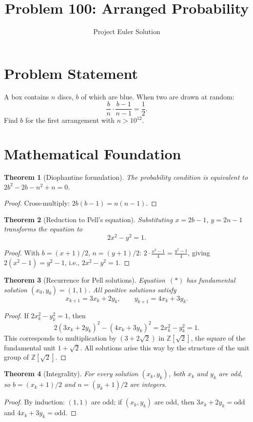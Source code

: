 \documentclass[12pt]{article}
\title{Problem 100: Arranged Probability}
\author{Project Euler Solution}
\date{}
\newtheorem{theorem}{Theorem}
\begin{document}
\maketitle

\section{Problem Statement}
A box contains $n$ discs, $b$ of which are blue. When two are drawn at random:
\[
\frac{b}{n} \cdot \frac{b-1}{n-1} = \frac{1}{2}.
\]
Find $b$ for the first arrangement with $n > 10^{12}$.

\section{Mathematical Foundation}

\begin{theorem}[Diophantine formulation]
The probability condition is equivalent to $2b^2 - 2b - n^2 + n = 0$.
\end{theorem}
\begin{proof}
Cross-multiply: $2b(b-1) = n(n-1)$.
\end{proof}

\begin{theorem}[Reduction to Pell's equation]
\label{thm:pell}
Substituting $x = 2b - 1$, $y = 2n - 1$ transforms the equation to
\[
2x^2 - y^2 = 1. \tag{$*$}
\]
\end{theorem}
\begin{proof}
With $b = (x+1)/2$, $n = (y+1)/2$: $2 \cdot \frac{x^2-1}{4} = \frac{y^2-1}{4}$, giving $2(x^2-1) = y^2-1$, i.e., $2x^2 - y^2 = 1$.
\end{proof}

\begin{theorem}[Recurrence for Pell solutions]
\label{thm:rec}
Equation~$(*)$ has fundamental solution $(x_0, y_0) = (1, 1)$. All positive solutions satisfy
\[
x_{k+1} = 3x_k + 2y_k, \qquad y_{k+1} = 4x_k + 3y_k.
\]
\end{theorem}
\begin{proof}
If $2x_k^2 - y_k^2 = 1$, then
\[
2(3x_k + 2y_k)^2 - (4x_k + 3y_k)^2 = 2x_k^2 - y_k^2 = 1.
\]
This corresponds to multiplication by $(3 + 2\sqrt{2})$ in $\mathbb{Z}[\sqrt{2}]$, the square of the fundamental unit $1 + \sqrt{2}$. All solutions arise this way by the structure of the unit group of $\mathbb{Z}[\sqrt{2}]$.
\end{proof}

\begin{theorem}[Integrality]
For every solution $(x_k, y_k)$, both $x_k$ and $y_k$ are odd, so $b = (x_k+1)/2$ and $n = (y_k+1)/2$ are integers.
\end{theorem}
\begin{proof}
By induction: $(1,1)$ are odd; if $(x_k, y_k)$ are odd, then $3x_k + 2y_k = \text{odd}$ and $4x_k + 3y_k = \text{odd}$.
\end{proof}
\end{document}
